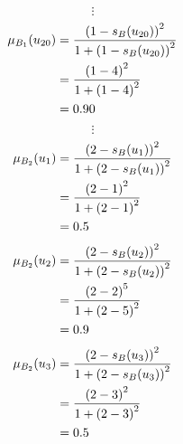 \documentclass[a4paper]{book}
\begin{document}
				\[
					\vdots
				\]
				\begin{align}
					\mu_{B_1}(u_{20}) &= \frac{\left(1-s_B(u_{20})\right)^2}{1 + \left(1-s_B(u_{20})\right)^2}\\
					&= \frac{\left(1-4\right)^2}{1 + \left(1-4\right)^2} \notag \\
					&= 0.90 \notag
				\end{align}
				\[
					\vdots
				\]
				\begin{align}
					\mu_{B_2}(u_1) &= \frac{\left(2-s_B(u_1)\right)^2}{1 + \left(2-s_B(u_1)\right)^2}\\
					&= \frac{\left(2-1\right)^2}{1 + \left(2-1\right)^2} \notag \\
					&= 0.5 \notag
				\end{align}
				\begin{align}
					\mu_{B_2}(u_2) &= \frac{\left(2-s_B(u_2)\right)^2}{1 + \left(2-s_B(u_2)\right)^2}\\
					&= \frac{\left(2-2\right)^5}{1 + \left(2-5\right)^2} \notag \\
					&= 0.9 \notag
				\end{align}
				\begin{align}
					\mu_{B_2}(u_3) &= \frac{\left(2-s_B(u_3)\right)^2}{1 + \left(2-s_B(u_3)\right)^2}\\
					&= \frac{\left(2-3\right)^2}{1 + \left(2-3\right)^2} \notag \\
					&= 0.5 \notag
				\end{align}
\end{document}
